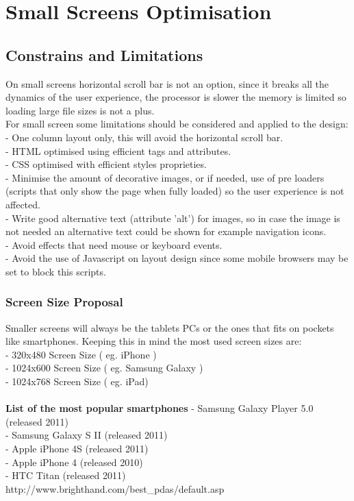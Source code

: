 

\section{Small Screens Optimisation}

\subsection{Constrains and Limitations}
On small screens horizontal scroll bar is not an option, since it breaks all the dynamics of the user experience, the processor is slower the memory is limited so loading large file sizes is not a plus.\\
For small screen some limitations should be considered and applied to the design:\\
- One column layout only, this will avoid the horizontal scroll bar.\\
- HTML optimised using efficient tags and attributes.\\
- CSS optimised with efficient styles proprieties.\\
- Minimise the amount of decorative images, or if needed, use of pre loaders (scripts that only show the page when fully loaded) so the user experience is not affected.\\
- Write good alternative text (attribute 'alt')  for images, so in case the image is not needed an alternative text could be shown for example navigation icons.\\
- Avoid effects that need mouse or keyboard events.\\
- Avoid the use of Javascript on layout design since some mobile browsers may be set to block this scripts.

\subsubsection{Screen Size Proposal}
Smaller screens will always be the tablets PCs or the ones that fits on pockets like smartphones. Keeping this in mind the most used screen sizes are:\\
- 320x480 Screen Size ( eg. iPhone )\\ 	%
- 1024x600 Screen Size ( eg. Samsung Galaxy )\\
- 1024x768 Screen Size ( eg. iPad)\\
\\
\textbf{List of the most popular smartphones}
- Samsung Galaxy Player 5.0 (released 2011)\\
- Samsung Galaxy S II (released 2011)\\
- Apple iPhone 4S (released 2011)\\
- Apple iPhone 4 (released 2010)\\
- HTC Titan (released 2011)\\
http://www.brighthand.com/best\_pdas/default.asp\\


